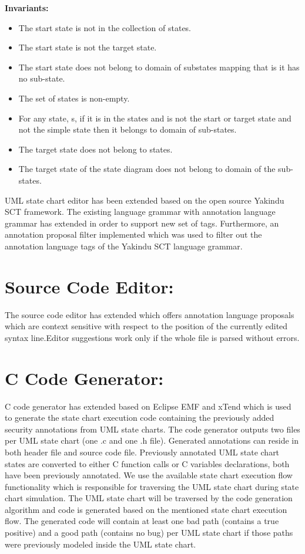 \textbf{Invariants:}
\begin{itemize}
\item The start state is not in the collection of states.
\item The start state is not the target state.
\item The start state does not belong to domain of substates
mapping that is it has no sub-state.
\item The set of states is non-empty.
\item For any state, s, if it is in the states and is not the start or target state and not the simple state then it belongs to domain of sub-states.
\item The target state does not belong to states.
\item The target state of the state diagram does not belong to domain of the sub-states.
\end{itemize}

UML state chart editor has been extended based on the open source Yakindu SCT \cite{ref_15_yakindu:sct}framework. The existing language grammar with
annotation language grammar has extended in order to support new set
of tags. Furthermore, an annotation proposal filter implemented which was used to filter out the annotation language tags of the Yakindu SCT language grammar.\\

\section{Source Code Editor:}
The source code editor has extended which offers annotation language proposals which are context sensitive with respect to the position of the currently edited syntax line.Editor suggestions work only if the whole file is parsed without errors.

\section{C Code Generator:}
C code generator has extended based on Eclipse EMF and xTend which is used to generate the state chart execution code containing the previously added security annotations from UML state charts. The code generator outputs two files per UML state chart (one .c and one
.h file). Generated annotations can reside in both header file
and source code file. Previously annotated UML state chart
states are converted to either C function calls or C variables
declarations, both have been previously annotated. We use
the available state chart execution flow functionality which is
responsible for traversing the UML state chart during state
chart simulation. The UML state chart will be traversed by the code generation algorithm and code is generated based on
the mentioned state chart execution flow. The generated code
will contain at least one bad path (contains a true positive) and
a good path (contains no bug) per UML state chart if those
paths were previously modeled inside the UML state chart.

